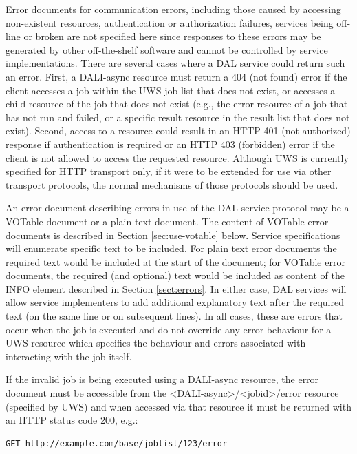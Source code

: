 \documentclass[11pt,letter]{ivoa}
\begin{document}
Error documents for communication errors, including those caused by accessing
non-existent resources, authentication or authorization failures, services being
off-line or broken are not specified here since responses to these errors may be
generated by other off-the-shelf software and cannot be controlled by service
implementations. There are several cases where a DAL service could return such
an error. First, a DALI-async resource must return a 404 (not found) error if
the client accesses a job within the UWS job list that does not exist, or
accesses a child resource of the job that does not exist (e.g., the error
resource of a job that has not run and failed, or a specific result resource in
the result list  that does not exist). Second, access to a resource could result
in an HTTP 401 (not authorized) response if authentication is required or an
HTTP 403 (forbidden) error if the client is not allowed to access the requested
resource. Although UWS is currently specified for HTTP transport only, if it
were to be extended for use via other transport protocols, the normal mechanisms
of those protocols should be used.

An error document describing errors in use of the DAL service protocol may be a
VOTable document \citep{2019ivoa.spec.1021O} or a plain text document.
The content of
VOTable error documents is described in Section \ref{sec:use-votable} below. Service
specifications will enumerate specific text to be included. For plain text error
documents the required text would be included at the start of the document; for
VOTable error documents, the required (and optional) text would be included as
content of the INFO element described in Section \ref{sect:errors}. In either case, DAL
services will allow service implementers to add additional explanatory text
after the required text (on the same line or on subsequent lines). In all cases,
these are errors that occur when the job is executed and do not override any
error behaviour for a UWS resource which specifies the behaviour and errors
associated with interacting with the job itself.

If the invalid job is being executed using a DALI-async resource, the error
document must be accessible from the <DALI-async>/<jobid>/error resource
(specified by UWS) and when accessed via that resource it must be returned with
an HTTP status code 200, e.g.:

\begin{verbatim}
GET http://example.com/base/joblist/123/error
\end{verbatim}
\end{document}
